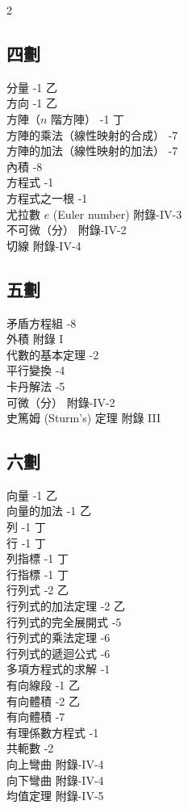 \begin{multicols}{2}
\subsection*{四\quad 劃}
\noindent
分量 -1 乙\\
方向 -1 乙\\
方陣（$n$ 階方陣） -1 丁\\
方陣的乘法（線性映射的合成） -7\\
方陣的加法（線性映射的加法） -7\\
內積 -8\\
方程式 -1\\
方程式之一根 -1\\
尤拉數 $e$ (Euler number) \dotfill 附錄-IV-3\\
不可微（分） \dotfill 附錄-IV-2\\
切線 \dotfill 附錄-IV-4

\subsection*{五\quad 劃}
\noindent
矛盾方程組 -8\\
外積 \dotfill 附錄 I\\
代數的基本定理 -2\\
平行變換 -4\\
卡丹解法 -5\\
可微（分） \dotfill 附錄-IV-2\\
史篤姆 (Sturm's) 定理 \dotfill 附錄 III

\subsection*{六\quad 劃}
\noindent
向量 -1 乙\\
向量的加法 -1 乙\\
列 -1 丁\\
行 -1 丁\\
列指標 -1 丁\\
行指標 -1 丁\\
行列式 -2 乙\\
行列式的加法定理 -2 乙\\
行列式的完全展開式 -5\\
行列式的乘法定理 -6\\
行列式的遞迴公式 -6\\
多項方程式的求解 -1\\
有向線段 -1 乙\\
有向體積 -2 乙\\
有向體積 -7\\
有理係數方程式 -1\\
共軛數 -2\\
向上彎曲 \dotfill 附錄-IV-4\\
向下彎曲 \dotfill 附錄-IV-4\\
均值定理 \dotfill 附錄-IV-5


\end{multicols}
